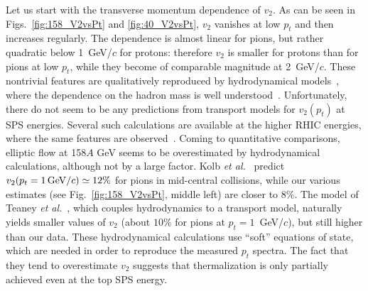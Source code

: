 \documentclass[aps,prc,superscriptaddress,showpacs,floatfix,nofootinbib]{revtex4}
\begin{document}
Let us start with the transverse momentum dependence of $v_2$.  As can
be seen in Figs.~\ref{fig:158_V2vsPt} and \ref{fig:40_V2vsPt}, $v_2$
vanishes at low $p_t$ and then increases regularly.  The dependence is
almost linear for pions, but rather quadratic below 1~GeV/$c$ for
protons: therefore $v_2$ is smaller for protons than for pions at low
$p_t$, while they become of comparable magnitude at 2~GeV/$c$.  These
nontrivial features are qualitatively reproduced by hydrodynamical
models~\cite{Kolb:00,Kolb:2000fh}, where the dependence on the hadron
mass is well understood~\cite{pasi2}.  Unfortunately, there do not
seem to be any predictions from transport models for $v_2(p_t)$ at SPS
energies. Several such calculations are available at the higher RHIC
energies, where the same features are
observed~\cite{Bleicher:2000sx,Lin:2001zk,Humanic:2002iw,Sahu:2002sp}.
Coming to quantitative comparisons, elliptic flow at 158$A$ GeV
seems to be overestimated by hydrodynamical calculations, although not
by a large factor.  Kolb {\em et al.}~\cite{Kolb:00} predict
$v_2(p_t=1\,{\rm GeV}/c)\simeq 12\%$ for pions in mid-central
collisions, while our various estimates (see
Fig.~\ref{fig:158_V2vsPt}, middle left) are closer to $8\%$.  The
model of Teaney {\em et al.}~\cite{Teaney:2001av}, which couples
hydrodynamics to a transport model, naturally yields smaller values of
$v_2$ (about $10\%$ for pions at $p_t=1$~GeV/$c$), but still higher 
than our data. These hydrodynamical calculations use ``soft''
equations of state, which are needed in order to reproduce the
measured $p_t$ spectra.  The fact that they tend to overestimate $v_2$
suggests that thermalization is only partially achieved even at the
top SPS energy.
\end{document}
